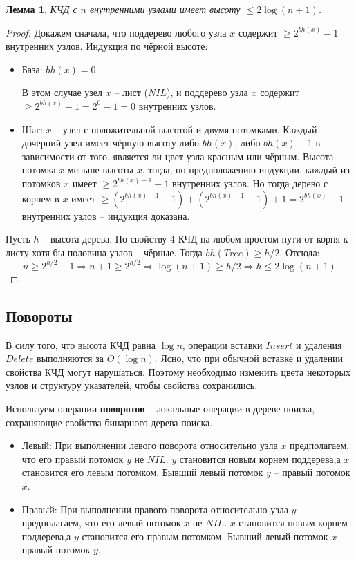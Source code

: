 \documentclass[a4paper,12pt]{article}
\newtheorem*{fulllemma}{Лемма}
\begin{document}
\begin{fulllemma}
КЧД с $n$ внутренними узлами имеет высоту $\leqslant 2\log (n + 1)$.
\end{fulllemma}
\begin{proof}
    Докажем сначала, что поддерево любого узла $x$ содержит $\geqslant 2^{bh(x)} - 1$ внутренних узлов. Индукция по чёрной высоте:
    
    \begin{itemize}
        \item База: $bh(x) = 0$.
        
        В этом случае узел $x$ -- лист ($NIL$), и поддерево узла $x$ содержит $\geqslant 2^{bh(x)} - 1 = 2^0 - 1 = 0$ внутренних узлов.
        
        \item Шаг: $x$ -- узел с положительной высотой и двумя потомками. Каждый дочерний узел имеет чёрную высоту либо $bh(x)$, либо $bh(x) - 1$ в зависимости от того, является ли цвет узла красным или чёрным. Высота потомка $x$ меньше высоты $x$, тогда, по предположению индукции, каждый из потомков $x$ имеет $\geqslant 2^{bh(x) - 1} - 1$ внутренних узлов. Но тогда дерево с корнем в $x$ имеет $\geqslant (2^{bh(x) - 1} - 1) + (2^{bh(x) - 1} - 1) + 1 = 2^{bh(x)} - 1$ внутренних узлов -- индукция доказана. 
    \end{itemize}
    
    Пусть $h$ -- высота дерева. По свойству 4 КЧД на любом простом пути от корня к листу хотя бы половина узлов -- чёрные. Тогда $bh(Tree) \geqslant h\slash2$. Отсюда: \[n \geqslant 2^{h\slash2} - 1 \Rightarrow n + 1 \geqslant 2^{h\slash2} \Rightarrow \log (n + 1) \geqslant h\slash2 \Rightarrow h \leqslant 2 \log (n + 1)\]
\end{proof}

\subsection{Повороты}

В силу того, что высота КЧД равна $\log n$, операции вставки $Insert$ и удаления $Delete$ выполняются за $O(\log n)$. Ясно, что при обычной вставке и удалении свойства КЧД могут нарушаться. Поэтому необходимо изменить цвета некоторых узлов и структуру указателей, чтобы свойства сохранились.

Используем операции \textbf{поворотов} -- локальные операции в дереве поиска, сохраняющие свойства бинарного дерева поиска.

\begin{itemize}
    \item Левый: При выполнении левого поворота относительно узла $x$ предполагаем, что его правый потомок $y$ не $NIL$. $y$ становится новым корнем поддерева,а $x$ становится его левым потомком. Бывший левый потомок $y$ -- правый потомок $x$.
    \item Правый: При выполнении правого поворота относительно узла $y$ предполагаем, что его левый потомок $x$ не $NIL$. $x$ становится новым корнем поддерева,а $y$ становится его правым потомком. Бывший левый потомок $x$ -- правый потомок $y$.
\end{itemize}
\end{document}
